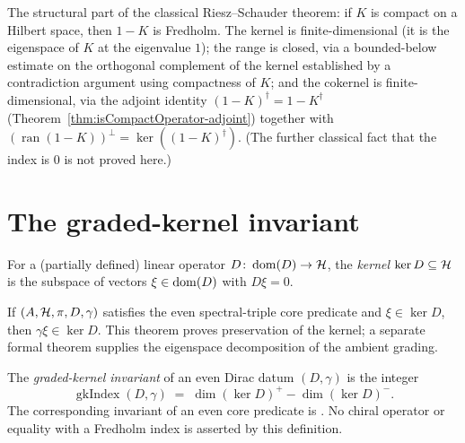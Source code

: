 \begin{theorem}
  \label{thm:isFredholm-one-sub}
  \leanok
  The structural part of the classical Riesz--Schauder theorem: if $K$ is compact on a
  Hilbert space, then $1 - K$ is Fredholm. The kernel is finite-dimensional (it is the
  eigenspace of $K$ at the eigenvalue $1$); the range is closed, via a bounded-below estimate
  on the orthogonal complement of the kernel established by a contradiction argument using
  compactness of $K$; and the cokernel is finite-dimensional, via the adjoint identity
  $(1-K)^{\dagger} = 1 - K^{\dagger}$ (Theorem~\ref{thm:isCompactOperator-adjoint}) together
  with $(\operatorname{ran}(1-K))^{\perp} = \ker((1-K)^{\dagger})$. (The further classical fact
  that the index is $0$ is not proved here.)
\end{theorem}

\section{The graded-kernel invariant}
\label{sec:graded-kernel-index}

\begin{definition}
  \label{def:Dkernel}
  \leanok
  For a (partially defined) linear operator $D \colon \operatorname{dom}(D) \to \mathcal{H}$, the \emph{kernel}
  $\ker D \subseteq \mathcal{H}$ is the subspace of vectors $\xi \in \operatorname{dom}(D)$ with $D\xi = 0$.
\end{definition}

\begin{lemma}
  \label{lem:grading-mem-Dkernel}
  \leanok
  If $(A, \mathcal{H}, \pi, D, \gamma)$ satisfies the even spectral-triple core predicate and
  $\xi \in \ker D$, then $\gamma \xi \in \ker D$.  This theorem proves preservation of the
  kernel; a separate formal theorem supplies the eigenspace decomposition of the ambient
  grading.
\end{lemma}

\begin{definition}
  \label{def:graded-kernel-index}
  \leanok
  The \emph{graded-kernel invariant} of an even Dirac datum $(D, \gamma)$ is the integer
  \[
    \operatorname{gkIndex}(D, \gamma) \;=\; \dim (\ker D)^{+} - \dim (\ker D)^{-}.
  \]
  The corresponding invariant of an even core predicate is
  \leanok.  No chiral operator or equality with
  a Fredholm index is asserted by this definition.
\end{definition}

